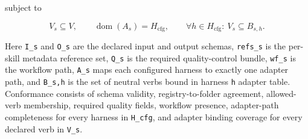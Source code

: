 \documentclass[
]{article}
\begin{document}
subject to

\begin{equation}
\label{eq:skill-conformance}
V_s \subseteq V,\qquad \operatorname{dom}(A_s)=H_{\mathrm{cfg}},\qquad \forall h \in H_{\mathrm{cfg}}:\ V_s \subseteq B_{s,h}.
\end{equation}

Here \texttt{I\_s} and \texttt{O\_s} are the declared input and output
schemas, \texttt{refs\_s} is the per-skill metadata reference set,
\texttt{Q\_s} is the required quality-control bundle, \texttt{wf\_s} is
the workflow path, \texttt{A\_s} maps each configured harness to exactly
one adapter path, and \texttt{B\_s,h} is the set of neutral verbs bound
in harness \texttt{h} adapter table. Conformance consists of schema
validity, registry-to-folder agreement, allowed-verb membership,
required quality fields, workflow presence, adapter-path completeness
for every harness in \texttt{H\_cfg}, and adapter binding coverage for
every declared verb in \texttt{V\_s}.
\end{document}
